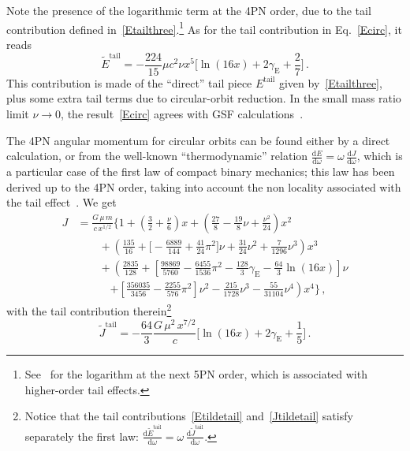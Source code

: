 \documentclass[prd,preprint,superscriptaddress,tightenlines,nofootinbib,
  eqsecnum,showpacs]{revtex4}
\newcommand{\ud}{\mathrm{d}}
\begin{document}
%
Note the presence of the logarithmic term at the 4PN order, due to the
tail contribution defined in~\eqref{Etailthree}.\footnote{See~\cite{BDLW10b,
    LBW12} for the logarithm at the next 5PN order, which is associated
  with higher-order tail effects.} As for the tail contribution in
Eq.~\eqref{Ecirc}, it reads
%
\begin{equation}\label{Etildetail}
\tilde{E}^\text{tail} = - \frac{224}{15} \mu c^2 \nu x^5\biggl[\ln\left(16
  x\right) + 2\gamma_\text{E} + \frac{2}{7}\biggr] \,.
\end{equation}
%
This contribution is made of the ``direct'' tail piece $E^\text{tail}$ given
by~\eqref{Etailthree}, plus some extra tail terms due to circular-orbit reduction. In the small mass ratio limit $\nu\to 0$, the
result~\eqref{Ecirc} agrees with GSF calculations~\cite{BDLW10b,LBW12,LBB12,BiniD13}. 

The 4PN angular momentum for
circular orbits can be found either by a direct calculation, or from the
well-known ``thermodynamic'' relation
$\frac{\ud E}{\ud \omega} = \omega \, \frac{\ud J}{\ud \omega}$, which is a
particular case of the first law of compact binary mechanics; this law has been
derived up to the 4PN order, taking into account the non locality associated
with the tail effect~\cite{BL17}. We get
%
\begin{align}\label{Jcirc}
    J &= \frac{G \,\mu \,m}{c\,x^{1/2}} \biggl\{ 1 + \left(
    \frac{3}{2} + \frac{\nu}{6} \right) x + \left( \frac{27}{8} -
    \frac{19}{8} \nu + \frac{\nu^2}{24} \right) x^2 \nonumber
    \\ &\quad\quad + \left( \frac{135}{16} + \biggl[ -
      \frac{6889}{144} + \frac{41}{24} \pi^2 \biggr] \nu +
    \frac{31}{24} \nu^2 + \frac{7}{1296} \nu^3 \right) x^3 \nonumber
    \\ &\quad\quad + \left( \frac{2835}{128} +
    \left[\frac{98869}{5760}-\frac{6455}{1536}\pi^2 -
      \frac{128}{3}\gamma_\text{E} -
      \frac{64}{3}\ln(16x)\right]\nu\right.\nonumber\\ &
    \quad\quad\quad \left.+
    \left[\frac{356035}{3456}-\frac{2255}{576}\pi^2\right]\nu^2
    -\frac{215}{1728}\nu^3 - \frac{55}{31104}\nu^4\right) x^4 \biggr\}
    \,,
\end{align}
%
with the tail contribution therein\footnote{Notice that the tail
  contributions~\eqref{Etildetail} and~\eqref{Jtildetail} satisfy separately
  the first law:
  $\frac{\ud \tilde{E}^\text{tail}}{\ud \omega} = \omega \, \frac{\ud
    \tilde{J}^\text{tail}}{\ud \omega}$.}
%
\begin{equation}\label{Jtildetail}
\tilde{J}^\text{tail} = - \frac{64}{3} \frac{G\,\mu^2\,x^{7/2}}{c}\biggl[\ln\left(16
  x\right) + 2\gamma_\text{E} + \frac{1}{5}\biggr] \,.
\end{equation}
%
\end{document}

